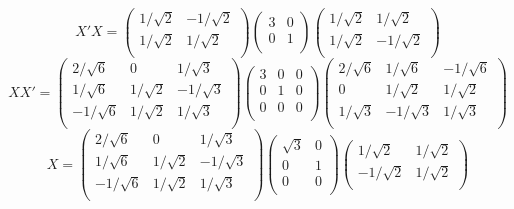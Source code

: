 \begin{problem}
\begin{sol}
\[
X'X =
\begin{pmatrix}
1/\sqrt{2} & -1/\sqrt{2} \\
1/\sqrt{2} & 1/\sqrt{2} \\
\end{pmatrix}
\begin{pmatrix}
3 & 0 \\
0 & 1 \\
\end{pmatrix}
\begin{pmatrix}
1/\sqrt{2} & 1/\sqrt{2} \\
1/\sqrt{2} & -1/\sqrt{2} \\
\end{pmatrix}
\]
\[
XX' =
\begin{pmatrix}
2/\sqrt{6} & 0 & 1/\sqrt{3} \\
1/\sqrt{6} & 1/\sqrt{2} & -1/\sqrt{3} \\
-1/\sqrt{6} & 1/\sqrt{2} & 1/\sqrt{3} \\
\end{pmatrix}
\begin{pmatrix}
3 & 0 & 0 \\
0 & 1 & 0 \\
0 & 0 & 0 \\
\end{pmatrix}
\begin{pmatrix}
2/\sqrt{6} & 1/\sqrt{6} & -1/\sqrt{6} \\
0 & 1/\sqrt{2} & 1/\sqrt{2} \\
1/\sqrt{3} & -1/\sqrt{3} & 1/\sqrt{3} \\
\end{pmatrix}
\]
\[
X =
\begin{pmatrix}
2/\sqrt{6} & 0 & 1/\sqrt{3} \\
1/\sqrt{6} & 1/\sqrt{2} & -1/\sqrt{3} \\
-1/\sqrt{6} & 1/\sqrt{2} & 1/\sqrt{3} \\
\end{pmatrix}
\begin{pmatrix}
\sqrt{3} & 0 \\
0 & 1 \\
0 & 0 \\
\end{pmatrix}
\begin{pmatrix}
1/\sqrt{2} & 1/\sqrt{2} \\
-1/\sqrt{2} & 1/\sqrt{2} \\
\end{pmatrix}
\]
  \end{sol}
  \end{problem}
  




